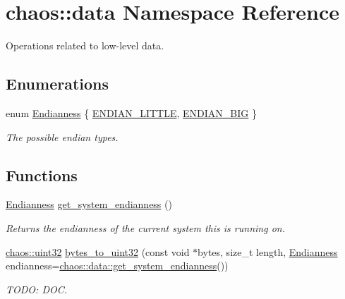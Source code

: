 \hypertarget{namespacechaos_1_1data}{}\section{chaos\+:\+:data Namespace Reference}
\label{namespacechaos_1_1data}


Operations related to low-\/level data.  


\subsection*{Enumerations}
\begin{DoxyCompactItemize}
\item 
enum \hyperlink{namespacechaos_1_1data_adb2657d50c0b84cdc1153001031bbf3f}{Endianness} \{ \hyperlink{namespacechaos_1_1data_adb2657d50c0b84cdc1153001031bbf3fa7fc5455bb6147c278dfa4a84e255c66d}{E\+N\+D\+I\+A\+N\+\_\+\+L\+I\+T\+T\+L\+E}, 
\hyperlink{namespacechaos_1_1data_adb2657d50c0b84cdc1153001031bbf3fa0e1ed99b965cedefe24534be309738ad}{E\+N\+D\+I\+A\+N\+\_\+\+B\+I\+G}
 \}\begin{DoxyCompactList}\small\item\em The possible endian types. \end{DoxyCompactList}
\end{DoxyCompactItemize}
\subsection*{Functions}
\begin{DoxyCompactItemize}
\item 
\hypertarget{namespacechaos_1_1data_a853118d28d026784faad6673bbcf526f}{}\hyperlink{namespacechaos_1_1data_adb2657d50c0b84cdc1153001031bbf3f}{Endianness} \hyperlink{namespacechaos_1_1data_a853118d28d026784faad6673bbcf526f}{get\+\_\+system\+\_\+endianness} ()\label{namespacechaos_1_1data_a853118d28d026784faad6673bbcf526f}

\begin{DoxyCompactList}\small\item\em Returns the endianness of the current system this is running on. \end{DoxyCompactList}\item 
\hypertarget{namespacechaos_1_1data_acb302083553072deedf6162f524113e2}{}\hyperlink{namespacechaos_a3b3a47ba1e284655bf1a30c441121c60}{chaos\+::uint32} \hyperlink{namespacechaos_1_1data_acb302083553072deedf6162f524113e2}{bytes\+\_\+to\+\_\+uint32} (const void $\ast$bytes, size\+\_\+t length, \hyperlink{namespacechaos_1_1data_adb2657d50c0b84cdc1153001031bbf3f}{Endianness} endianness=\hyperlink{namespacechaos_1_1data_a853118d28d026784faad6673bbcf526f}{chaos\+::data\+::get\+\_\+system\+\_\+endianness}())\label{namespacechaos_1_1data_acb302083553072deedf6162f524113e2}

\begin{DoxyCompactList}\small\item\em T\+O\+D\+O\+: D\+O\+C. \end{DoxyCompactList}\end{DoxyCompactItemize}


